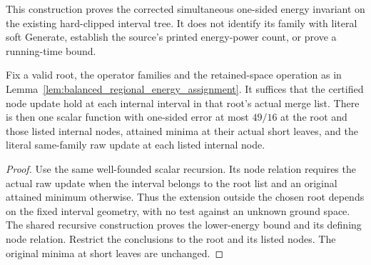 This construction proves the corrected simultaneous one-sided energy
invariant on the existing hard-clipped interval tree. It does not identify
its family with literal soft Generate, establish the source's printed
energy-power count, or prove a running-time bound.


\begin{lemma}
    \label{lem:balanced_root_regional_energy_assignment}
    \leanok
    Fix a valid root, the operator families and the retained-space
    operation as in Lemma~\ref{lem:balanced_regional_energy_assignment}.
    It suffices that the certified node update hold at each internal
    interval in that root's actual merge list. There is then one
    scalar function with one-sided error at most $49/16$ at the root
    and those listed internal nodes, attained minima at their actual
    short leaves, and the literal same-family raw update at each
    listed internal node.
\end{lemma}
\begin{proof}\leanok
    Use the same well-founded scalar recursion. Its node relation
    requires the actual raw update when the interval belongs to the
    root list and an original attained minimum otherwise. Thus the
    extension outside the chosen root depends on the fixed interval
    geometry, with no test against an unknown ground space. The shared
    recursive construction proves the lower-energy bound and its
    defining node relation. Restrict the conclusions to the root and
    its listed nodes. The original minima at short leaves are unchanged.
\end{proof}


